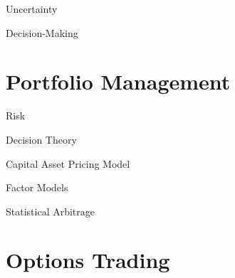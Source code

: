 \documentclass{beamer}
\begin{document}
\begin{frame}{Uncertainty}
\end{frame}

\begin{frame}{Decision-Making}
\end{frame}

\section{Portfolio Management}
\begin{frame}{Risk}
\end{frame}

\begin{frame}{Decision Theory}
\end{frame}

\begin{frame}{Capital Asset Pricing Model}
\end{frame}

\begin{frame}{Factor Models}
\end{frame}

\begin{frame}{Statistical Arbitrage}
\end{frame}

\section{Options Trading}

\end{document}

